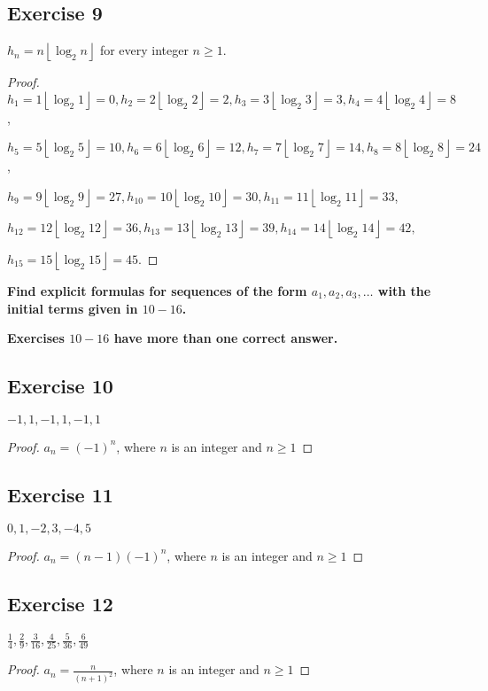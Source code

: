 \documentclass[14pt]{extarticle}
\newcommand{\dps}{\displaystyle}
\newcommand{\floor}[1]{{\left\lfloor#1\right\rfloor}}
\newcommand{\cy}{\color{cyan}}
\begin{document}
\subsection{Exercise 9}
$h_n = n\floor{\log_2 n}$ for every integer $n \geq 1$.

\begin{proof}
    $h_1 = 1\floor{\log_2 1} = 0, h_2 = 2\floor{\log_2 2} = 2, h_3 = 3\floor{\log_2 3} = 3, h_4 = 4\floor{\log_2 4} = 8$,

    $h_5 = 5\floor{\log_2 5} = 10, h_6 = 6\floor{\log_2 6} = 12, h_7 = 7\floor{\log_2 7} = 14, h_8 = 8\floor{\log_2 8} = 24$,

    $h_9 = 9\floor{\log_2 9} = 27, h_{10} = 10\floor{\log_2 10} = 30, h_{11} = 11\floor{\log_2 11} = 33$,

    $h_{12} = 12\floor{\log_2 12} = 36, h_{13} = 13\floor{\log_2 13} = 39, h_{14} = 14\floor{\log_2 14} = 42,$

    $h_{15} = 15\floor{\log_2 15} = 45$.
\end{proof}

{\bf\cy Find explicit formulas for sequences of the form $a_1, a_2, a_3, \ldots$ with the initial terms given in $10-16$.}

{\bf\cy Exercises $10-16$ have more than one correct answer.}

\subsection{Exercise 10}
$-1, 1, -1, 1, -1, 1$

\begin{proof}
    $a_n = (-1)^n$, where $n$ is an integer and $n \geq 1$
\end{proof}

\subsection{Exercise 11}
$0, 1, -2, 3, -4, 5$

\begin{proof}
    $a_n = (n-1)(-1)^n$, where $n$ is an integer and $n \geq 1$
\end{proof}

\subsection{Exercise 12}
$\dps \frac{1}{4}, \frac{2}{9}, \frac{3}{16}, \frac{4}{25}, \frac{5}{36}, \frac{6}{49}$

\begin{proof}
    $\dps a_n = \frac{n}{(n+1)^2}$, where $n$ is an integer and $n \geq 1$
\end{proof}
\end{document}
